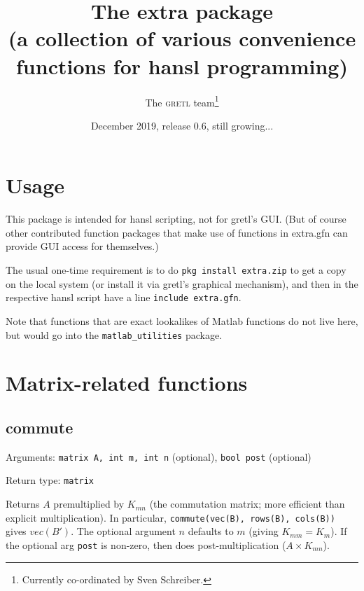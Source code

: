 \documentclass[11pt,english]{article}
\newcommand{\noun}[1]{\textsc{#1}}
\begin{document}
\title{The extra package\\
(a collection of various convenience functions for hansl programming) }

\date{December 2019, release 0.6, still growing... }

\author{The \noun{gretl} team\thanks{Currently co-ordinated by Sven Schreiber.}}

\maketitle
\tableofcontents{}

\section{Usage}

This package is intended for hansl scripting, not for gretl's GUI.
(But of course other contributed function packages that make use of
functions in extra.gfn can provide GUI access for themselves.)

The usual one-time requirement is to do \texttt{pkg install extra.zip}
to get a copy on the local system (or install it via gretl's graphical
mechanism), and then in the respective hansl script have a line \texttt{include
extra.gfn}.

Note that functions that are exact lookalikes of Matlab functions
do not live here, but would go into the \texttt{matlab\_utilities}
package.


\section{Matrix-related functions}

\subsection{commute}

Arguments: \texttt{matrix A, int m, int n} (optional), \texttt{bool
post} (optional)

\noindent Return type: \texttt{matrix}

Returns $A$ premultiplied by $K_{mn}$ (the commutation matrix; more
efficient than explicit multiplication). In particular, \texttt{commute(vec(B),
rows(B), cols(B))} gives $vec(B')$. The optional argument $n$ defaults to
$m$ (giving $K_{mm}=K_{m}$). If the optional arg \texttt{post} is
non-zero, then does post-multiplication ($A\times K_{mn}$). 
\end{document}
